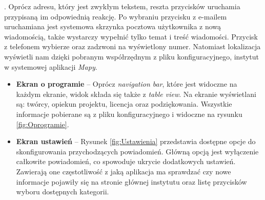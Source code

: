 \documentclass{iiuwb}
\begin{document}
\begin{itemize}
                                                                                                                                                                                                                                                         . Oprócz adresu, który jest zwykłym tekstem, reszta przycisków uruchamia przypisaną im odpowiednią reakcję. Po wybraniu przycisku z e-mailem uruchamiana jest systemowa skrzynka pocztowa użytkownika z nową wiadomością, także wystarczy wypełnić tylko temat i treść wiadomości. Przycisk z telefonem wybierze oraz zadzwoni na wyświetlony numer. Natomiast lokalizacja wyświetli nam dzięki pobranym współrzędnym z pliku konfiguracyjnego, instytut w systemowej aplikacji \textit{Mapy}. 
\end{itemize}
\newpage

\begin{itemize}

\item \textbf{Ekran o programie} -- Oprócz \textit{navigation bar}, które jest widoczne na każdym ekranie, widok składa się także z \textit{table view}. Na ekranie wyświetlani są: twórcy, opiekun projektu, licencja oraz podziękowania. Wszystkie informacje pobierane są z pliku konfiguracyjnego i widoczne na rysunku  \ref{fig:Oprogramie}.
\item \textbf{Ekran ustawień} -- Rysunek \ref{fig:Ustawienia} przedstawia dostępne opcje do skonfigurowania przychodzących powiadomień. Główną opcją jest wyłączenie całkowite powiadomień, co spowoduje ukrycie dodatkowych ustawień. Zawierają one częstotliwość z jaką aplikacja ma sprawdzać czy nowe informacje pojawiły się na stronie głównej instytutu oraz listę przycisków wyboru dostępnych kategorii.
\end{itemize}
\end{document}
